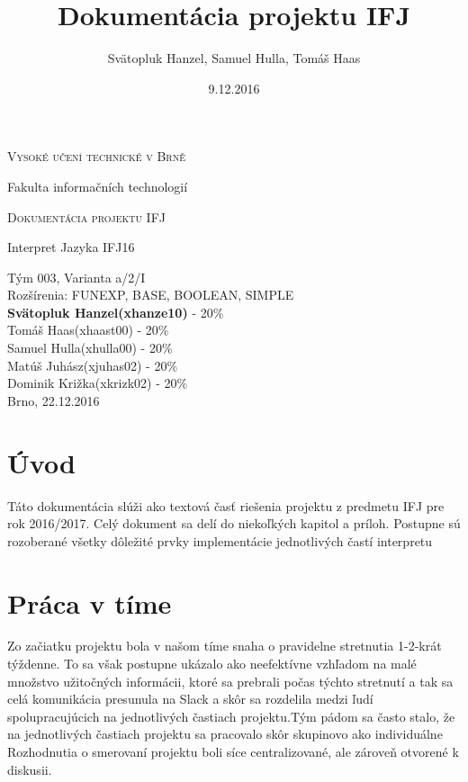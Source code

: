 \documentclass[12pt, a4paper]{article}
\title{Dokumentácia projektu IFJ}
\author{Svätopluk Hanzel, Samuel Hulla, Tomáš Haas}
\date{9.12.2016}
\begin{document}
    \begin{titlepage}
        \begin{center}
        {\scshape\LARGE Vysoké učení technické v Brně \par}
        {\Large Fakulta informačních technologií\par}
        \vspace{3cm}
        {\scshape\LARGE Dokumentácia projektu IFJ\par}
        {\Large Interpret Jazyka IFJ16 \par}
        \vspace{2cm}
        {\Large Tým 003, Varianta a/2/I}\\
        Rozšírenia: FUNEXP, BASE, BOOLEAN, SIMPLE\\
        \vfill
        \textbf{Svätopluk Hanzel(xhanze10)} - 20\% \\
        Tomáš Haas(xhaast00) - 20\% \\
        Samuel Hulla(xhulla00) - 20\% \\
        Matúš Juhász(xjuhas02) - 20\% \\
        Dominik Križka(xkrizk02) - 20\% \\
        \vspace{1cm}
        {\hfill Brno, 22.12.2016}
        \end{center}
    \end{titlepage}

    \tableofcontents{}
    \newpage
    \setcounter{page}{1}
    \section{Úvod}
    Táto dokumentácia slúži ako textová časť riešenia projektu z predmetu IFJ pre rok 2016/2017. Celý dokument sa delí do niekoľkých kapitol a príloh. Postupne sú rozoberané všetky dôležité prvky implementácie jednotlivých častí interpretu
    \section{Práca v tíme}
	    Zo začiatku projektu bola v našom tíme snaha o pravidelne stretnutia 1-2-krát týždenne. To sa však postupne ukázalo ako neefektívne vzhľadom na malé množstvo užitočných informácii, ktoré sa prebrali počas týchto stretnutí a tak sa celá komunikácia presunula na Slack a skôr sa rozdelila medzi ľudí spolupracujúcich na jednotlivých častiach projektu.Tým pádom sa často stalo, že na jednotlivých častiach projektu sa pracovalo skôr skupinovo ako individuálne \\
		 Rozhodnutia o smerovaní projektu boli síce centralizované, ale zároveň otvorené k diskusii.
\end{document}
